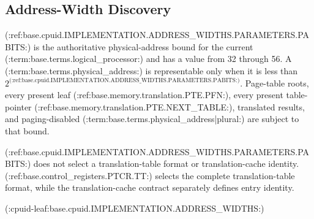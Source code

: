 \subsection{Address-Width Discovery}
(:ref:base.cpuid.IMPLEMENTATION.ADDRESS_WIDTHS.PARAMETERS.PABITS:) is the authoritative physical-address bound for the current
(:term:base.terms.logical_processor:) and has a value from 32 through 56. A (:term:base.terms.physical_address:) is
representable only when it is less than $2^{\text{(:ref:base.cpuid.IMPLEMENTATION.ADDRESS_WIDTHS.PARAMETERS.PABITS:)}}$. Page-table roots, every present leaf (:ref:base.memory.translation.PTE.PFN:), every present table-pointer (:ref:base.memory.translation.PTE.NEXT_TABLE:), translated
results, and paging-disabled (:term:base.terms.physical_address|plural:) are subject to that bound.

(:ref:base.cpuid.IMPLEMENTATION.ADDRESS_WIDTHS.PARAMETERS.PABITS:) does not select a translation-table format or translation-cache identity. (:ref:base.control_registers.PTCR.TT:) selects the
complete translation-table format, while the translation-cache contract separately defines entry identity.

(:cpuid-leaf:base.cpuid.IMPLEMENTATION.ADDRESS_WIDTHS:)
